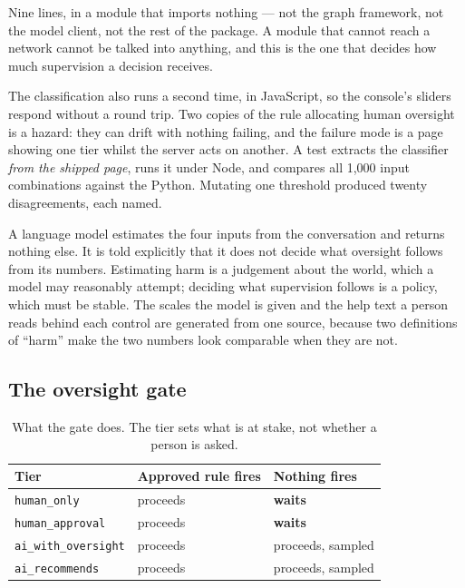 \documentclass[sigconf,nonacm]{acmart}
\begin{document}
Nine lines, in a module that imports nothing --- not the graph framework, not
the model client, not the rest of the package. A module that cannot reach a
network cannot be talked into anything, and this is the one that decides how
much supervision a decision receives.

The classification also runs a second time, in JavaScript, so the console's
sliders respond without a round trip. Two copies of the rule allocating human
oversight is a hazard: they can drift with nothing failing, and the failure mode
is a page showing one tier whilst the server acts on another. A test extracts
the classifier \emph{from the shipped page}, runs it under Node, and compares all
1{,}000 input combinations against the Python. Mutating one threshold produced
twenty disagreements, each named.

A language model estimates the four inputs from the conversation and returns
nothing else. It is told explicitly that it does not decide what oversight
follows from its numbers. Estimating harm is a judgement about the world, which
a model may reasonably attempt; deciding what supervision follows is a policy,
which must be stable. The scales the model is given and the help text a person
reads behind each control are generated from one source, because two definitions
of ``harm'' make the two numbers look comparable when they are not.

\subsection{The oversight gate}

\begin{table}[t]
\caption{What the gate does. The tier sets what is at stake, not whether a
person is asked.}
\label{tab:gate}
\small
\begin{tabular}{@{}lll@{}}
\toprule
\textbf{Tier} & \textbf{Approved rule fires} & \textbf{Nothing fires} \\
\midrule
\texttt{human\_only}        & proceeds & \textbf{waits} \\
\texttt{human\_approval}    & proceeds & \textbf{waits} \\
\texttt{ai\_with\_oversight}& proceeds & proceeds, sampled \\
\texttt{ai\_recommends}     & proceeds & proceeds, sampled \\
\bottomrule
\end{tabular}
\end{table}
\end{document}
